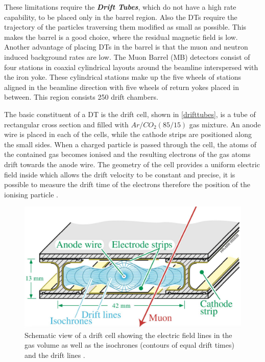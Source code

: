 These limitations require the \emph{\textbf{Drift Tubes}}, which do not have a high rate capability, to be placed only in the barrel region. Also the DTs require the trajectory of the particles traversing them modified as small as possible. This makes the barrel is a good choice, where the residual magnetic field is low. Another advantage of placing DTs in the barrel is that the muon and neutron induced background rates are low. The Muon Barrel (MB) detectors consist of four stations in coaxial cylindrical layouts around the beamline interspersed with the iron yoke. These cylindrical stations make up the five wheels of stations aligned in the beamline direction with five wheels of return yokes placed in between. This region consists 250 drift chambers.

The basic constituent of a DT is the drift cell, shown in \autoref{drifttubes}, is a tube of rectangular cross section and filled with $Ar/CO_2 (85/15)$ gas mixture. An anode wire is placed in each of the cells, while the cathode strips are positioned along the small sides. When a charged particle is passed through the cell, the atoms of the contained gas becomes ionised and the resulting electrons of the gas atoms drift towards the anode wire. The geometry of the cell provides a uniform electric field inside which allows the drift velocity to be constant and precise, it is possible to measure the drift time of the electrons therefore the position of the ionising particle \cite{Sirunyan_2018}.

\begin{figure}[ht]
	\centering
	\includegraphics[width=\textwidth]{MSc_Thesis/fig/drifttubes.png}
	\vspace{2mm}
	\caption[Schematic view of a drift cell showing the electric field lines in the gas volume as well as the isochrones (contours of equal drift times) and the drift lines.]{Schematic view of a drift cell showing the electric field lines in the gas volume as well as the isochrones (contours of equal drift times) and the drift lines \cite{Abbiendi:2705998}.}
	\label{drifttubes}
\end{figure}

